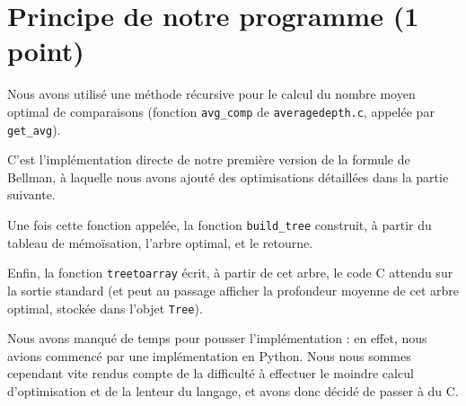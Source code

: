 \documentclass[a4paper, 10pt, french]{article}
\begin{document}
%
%

\section{Principe de notre  programme (1 point)}
{Nous avons utilisé une méthode récursive pour le calcul du nombre moyen optimal de comparaisons (fonction \verb?avg_comp? de \verb?averagedepth.c?, appelée par \verb?get_avg?).

C'est l'implémentation directe de notre première version de la formule de Bellman, à laquelle nous avons ajouté des optimisations détaillées dans la partie suivante.

Une fois cette fonction appelée, la fonction \verb?build_tree? construit, à partir du tableau de mémoïsation, l'arbre optimal, et le retourne.

Enfin, la fonction \verb?treetoarray? écrit, à partir de cet arbre, le code C attendu sur la sortie standard (et peut au passage afficher la profondeur moyenne de cet arbre optimal, stockée dans l'objet \verb?Tree?).

Nous avons manqué de temps pour pousser l'implémentation : en effet, nous avions commencé par une implémentation en Python. Nous nous sommes cependant vite rendus compte de la difficulté à effectuer le moindre calcul d'optimisation et de la lenteur du langage, et avons donc décidé de passer à du C.
} 
\end{document}
